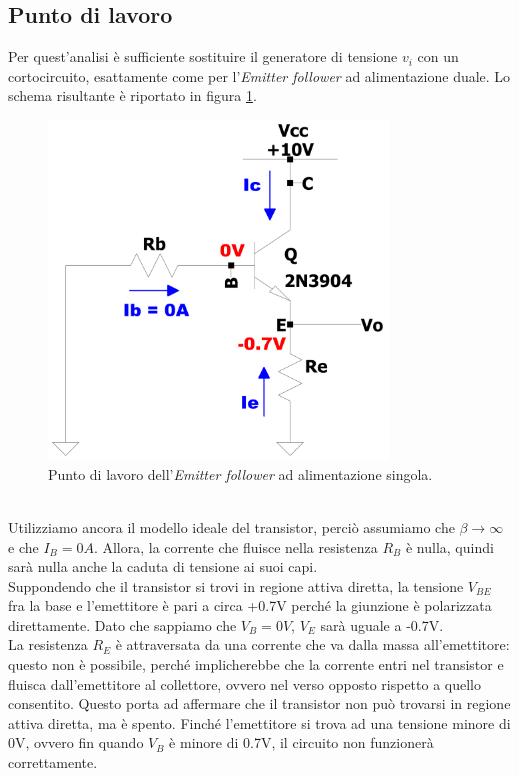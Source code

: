 \documentclass{report}
\begin{document}
\subsection{Punto di lavoro} %
Per quest'analisi è sufficiente sostituire il generatore di tensione $v_i$ con un cortocircuito, esattamente come per l'\textit{Emitter follower} ad alimentazione duale. Lo schema risultante è riportato in figura \ref{figura:EFv2_1_pl}.
\begin{figure}[h]
\centering
\includegraphics[height=9cm]{immagini/EFv2_1_pl}
\caption{Punto di lavoro dell'\textit{Emitter follower} ad alimentazione singola.}
\label{figura:EFv2_1_pl}
\end{figure}
\\Utilizziamo ancora il modello ideale del transistor, perciò assumiamo che $\displaystyle{\beta\rightarrow\infty}$ e che $I_{B}=0A$. Allora, la corrente che fluisce nella resistenza  $R_B$ è nulla, quindi sarà nulla anche la caduta di tensione ai suoi capi.
\\\indent Suppondendo che il transistor si trovi in regione attiva diretta, la tensione $V_{BE}$ fra la base e l'emettitore è pari a circa +0.7V perché la giunzione è polarizzata direttamente. Dato che sappiamo che $V_{B}=0V$, $V_{E}$ sarà uguale a -0.7V. 
\\\indent La resistenza $R_E$ è attraversata da una corrente che va dalla massa all'emettitore: questo non è possibile, perché implicherebbe che la corrente entri nel transistor e fluisca dall'emettitore al collettore, ovvero nel verso opposto rispetto a quello consentito. Questo porta ad affermare che il transistor non può trovarsi in regione attiva diretta, ma è spento. Finché l'emettitore si trova ad una tensione minore di 0V, ovvero fin quando $V_B$ è minore di 0.7V, il circuito non funzionerà correttamente.
\end{document}
